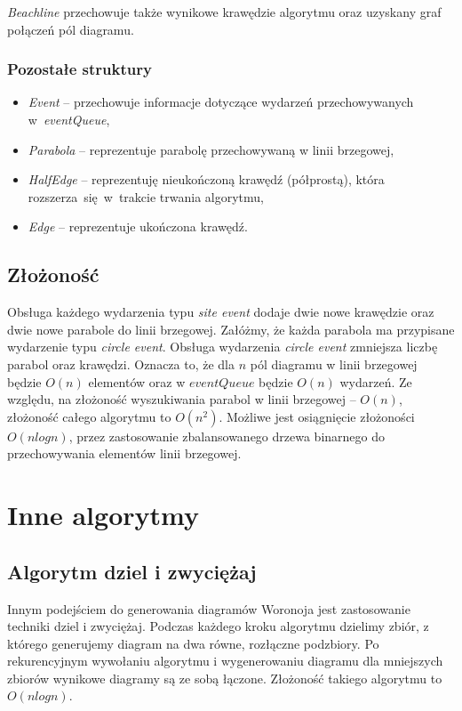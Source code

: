 \documentclass[declaration,shortabstract, inz]{iithesis}
\theoremstyle{definition} \newtheorem{definition}{Definicja}[]
\theoremstyle{plain} \newtheorem{remark}[definition]{Obserwacja}
\theoremstyle{plain} \newtheorem{theorem}[definition]{Twierdzenie}
\theoremstyle{plain} \newtheorem{example}{Przykład}[definition]
\theoremstyle{plain} \newtheorem{lemma}[definition]{Lemat}
\begin{document}
\textit{Beachline} przechowuje także wynikowe krawędzie algorytmu oraz uzyskany graf połączeń pól diagramu.

\subsubsection{Pozostałe struktury}
\begin{itemize}
	\item \textit{Event} -- przechowuje informacje dotyczące wydarzeń przechowywanych w~\textit{eventQueue},
	\item \textit{Parabola} -- reprezentuje parabolę przechowywaną w linii brzegowej,
	\item \textit{HalfEdge} -- reprezentuję nieukończoną krawędź (półprostą), która rozszerza~się~w~trakcie trwania algorytmu,
	\item \textit{Edge} -- reprezentuje ukończona krawędź.
\end{itemize}

\subsection{Złożoność}
Obsługa każdego wydarzenia typu \textit{site event} dodaje dwie nowe krawędzie oraz dwie nowe parabole do linii brzegowej. Załóżmy, że każda parabola ma przypisane wydarzenie typu \textit{circle event}. Obsługa wydarzenia \textit{circle event} zmniejsza liczbę parabol oraz krawędzi. Oznacza to, że dla $n$ pól diagramu w linii brzegowej będzie $O(n)$ elementów oraz w $eventQueue$ będzie $O(n)$ wydarzeń. Ze względu, na złożoność wyszukiwania parabol w linii brzegowej -- $O(n)$, złożoność całego algorytmu to $O(n^2)$. Możliwe jest osiągnięcie złożoności $O(nlogn)$, przez zastosowanie zbalansowanego drzewa binarnego do przechowywania elementów linii brzegowej.


\section{Inne algorytmy}

\subsection{Algorytm dziel i zwyciężaj}

Innym podejściem do generowania diagramów Woronoja jest zastosowanie techniki dziel i zwyciężaj. Podczas każdego kroku algorytmu dzielimy zbiór, z którego generujemy diagram na dwa równe, rozłączne podzbiory. Po rekurencyjnym wywołaniu algorytmu i wygenerowaniu diagramu dla mniejszych zbiorów wynikowe diagramy są ze sobą łączone. Złożoność takiego algorytmu to $O(nlogn)$.
\end{document}
